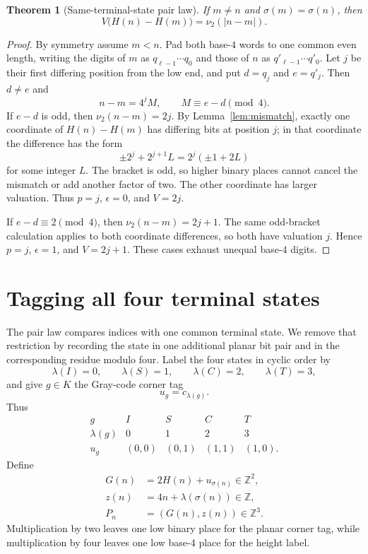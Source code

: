 \documentclass[11pt]{article}
\newtheorem{theorem}{Theorem}[section]
\theoremstyle{definition}
\theoremstyle{remark}
\newcommand{\Z}{\mathbb Z}
\newcommand{\vTwo}{\nu_2}
\newcommand{\abs}[1]{\lvert#1\rvert}
\begin{document}
\begin{theorem}[Same-terminal-state pair law]\label{thm:pair-law}
If $m\neq n$ and $\sigma(m)=\sigma(n)$, then
\begin{equation}\label{eq:pair-law}
 V\bigl(H(n)-H(m)\bigr)=\vTwo(\abs{n-m}).
\end{equation}
\end{theorem}

\begin{proof}
By symmetry assume $m<n$.  Pad both base-$4$ words to one common even length,
writing the digits of $m$ as $q_{\ell-1}\cdots q_0$ and those of $n$ as
$q'_{\ell-1}\cdots q'_0$.  Let $j$ be their first differing position from
the low end, and put $d=q_j$ and $e=q'_j$.  Then $d\neq e$ and
\[
 n-m=4^jM,\qquad M\equiv e-d\pmod4.
\]
If $e-d$ is odd, then $\vTwo(n-m)=2j$.  By
Lemma~\ref{lem:mismatch}, exactly one coordinate of $H(n)-H(m)$ has differing
bits at position $j$; in that coordinate the difference has the form
\[
 \pm2^j+2^{j+1}L=2^j(\pm1+2L)
\]
for some integer $L$.  The bracket is odd, so higher binary places cannot
cancel the mismatch or add another factor of two.  The other coordinate has
larger valuation.  Thus $p=j$, $\epsilon=0$, and $V=2j$.

If $e-d\equiv2\pmod4$, then $\vTwo(n-m)=2j+1$.  The same odd-bracket
calculation applies to both coordinate differences, so both have valuation
$j$.  Hence $p=j$, $\epsilon=1$, and $V=2j+1$.  These cases exhaust unequal
base-$4$ digits.
\end{proof}

\section{Tagging all four terminal states}\label{sec:tagging}

The pair law compares indices with one common terminal state.  We remove
that restriction by recording the state in one additional planar bit pair
and in the corresponding residue modulo four.  Label the four states in
cyclic order by
\[
 \lambda(I)=0,\qquad \lambda(S)=1,\qquad
 \lambda(C)=2,\qquad \lambda(T)=3,
\]
and give $g\in K$ the Gray-code corner tag
\[
 u_g=c_{\lambda(g)}.
\]
Thus
\[
\begin{array}{c|cccc}
g&I&S&C&T\\ \hline
\lambda(g)&0&1&2&3\\
u_g&(0,0)&(0,1)&(1,1)&(1,0).
\end{array}
\]
Define
\begin{equation}\label{eq:tagged-walk}
\begin{aligned}
 G(n)&=2H(n)+u_{\sigma(n)}\in\Z^2,\\
 z(n)&=4n+\lambda(\sigma(n))\in\Z,\\
 P_n&=(G(n),z(n))\in\Z^3.
\end{aligned}
\end{equation}
Multiplication by two leaves one low binary place for the planar corner tag,
while multiplication by four leaves one low base-$4$ place for the height
label.
\end{document}
